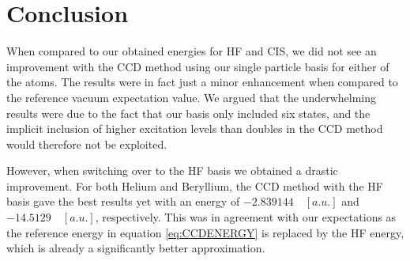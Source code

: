 \documentclass[a4paper,12pt]{article}
\begin{document}
\section{Conclusion}
\label{sec:Conclusion}

When compared to our obtained energies for HF and CIS, we did not see an improvement with the CCD method using our single particle basis for either of the atoms. The results were in fact just a minor enhancement when compared to the reference vacuum expectation value. We argued that the underwhelming results were due to the fact that our basis only included six states, and the implicit inclusion of higher excitation levels than doubles in the CCD method would therefore not be exploited.

However, when switching over to the HF basis we obtained a drastic improvement. For both Helium and Beryllium, the CCD method with the HF basis gave the best results yet with an energy of $-2.839144 \quad [a.u.]$ and $-14.5129 \quad [a.u.]$, respectively. This was in agreement with our expectations as the reference energy in equation \ref{eq:CCDENERGY} is replaced by the HF energy, which is already a significantly better approximation.

\newpage
\appendix


\newpage
\nocite{*}
\printbibliography
\end{document}
